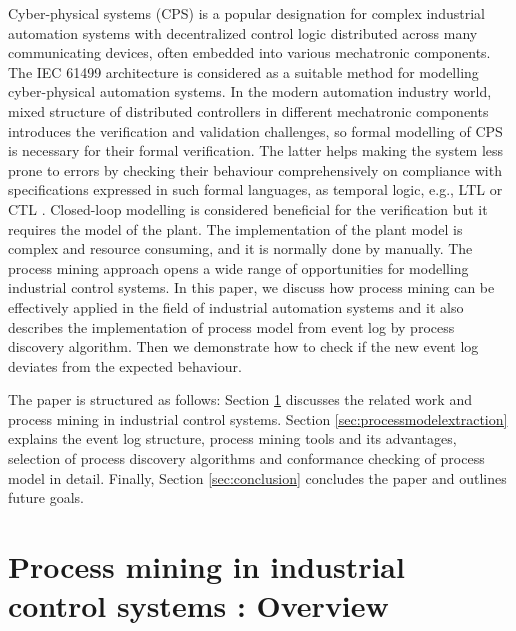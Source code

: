 \documentclass[conference]{IEEEtran}
\begin{document}
 
 Cyber-physical systems (CPS) \cite{lee2017introduction} is a popular designation for complex industrial automation systems with decentralized control logic distributed across many communicating devices, often embedded into various mechatronic components. The IEC 61499 architecture \cite{iec61499part12012} is considered as a suitable method for modelling cyber-physical automation systems. In the modern automation industry world, mixed structure of distributed controllers in different mechatronic components introduces the verification and validation challenges, so formal modelling of CPS is necessary for their formal verification. The latter helps making the system less prone to errors by checking their behaviour comprehensively on compliance with specifications expressed in such formal languages, as temporal logic, e.g., LTL or CTL \cite{yoong2015verification}. Closed-loop modelling is considered beneficial for the verification but it requires the model of the plant. The implementation of the plant model is complex and resource consuming, and it is normally done by manually. The process mining approach opens a wide range of opportunities for modelling industrial control systems. In this paper, we discuss how process mining can be effectively applied in the field of industrial automation systems and it also describes the implementation of process model from event log by process discovery algorithm. Then we demonstrate how to check if the new event log deviates from the expected behaviour.


The paper is structured as follows: Section \ref{sec:processmininginindustrialcontrolsystem}  discusses the related work and process mining in industrial control systems. Section \ref{sec:processmodelextraction} explains the event log structure, process mining tools and its advantages, selection of process discovery algorithms and conformance checking of process model in detail.  Finally, Section \ref{sec:conclusion} concludes the paper and outlines future goals.


\section{Process mining in industrial control systems : Overview}
\label{sec:processmininginindustrialcontrolsystem}
\end{document}
